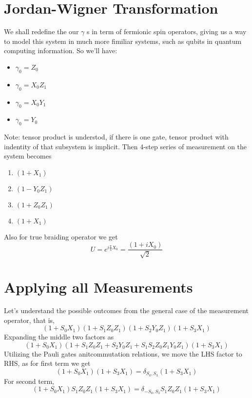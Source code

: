 \documentclass{article}
\begin{document}
\section{Jordan-Wigner Transformation} %
\label{sec:Jordan-Wigner Transformation}
We shall redefine the our $ \gamma $ s in term of fermionic spin operators, giving us a way to model 
this system in much more fimiliar systems, such as qubits in quantum computing information. So we'll have:
\begin{itemize}
  \item $ \gamma_0 = Z_0 $
  \item $ \gamma_0 = X_0 Z_1 $
  \item $ \gamma_0 = X_0 Y_1 $
  \item $ \gamma_0 = Y_0 $
\end{itemize}
Note: tensor product is understod, if there is one gate, tensor product with indentity of that subsystem is implicit.
Then 4-step series of measurement on the system becomes 
\begin{enumerate}
  \item $ (1 + X_1) $
  \item $ (1 - Y_0 Z_1) $
  \item $ (1 + Z_0 Z_1) $
  \item $ (1 + X_1) $
\end{enumerate}
Also for true braiding operator we get
\begin{equation}
  U = e^{i \frac{\pi}{4} X_0} = \frac{(1 + i X_0 )}{\sqrt{2}} 
  \label{eq:br Jordan-Wigner}
\end{equation}

\section{Applying all Measurements} %
\label{sec:Applying all Measurements}
Let's understand the possible outcomes from the general case of the measurement operator, 
that is,
\begin{equation}
  (1 +S_0 X_1) (1 +S_1 Z_0 Z_1) (1 +S_2 Y_0 Z_1) (1 +S_3 X_1)
  \label{eq:general meas}
\end{equation}
Expanding the middle two factors as
\begin{equation}
  (1 +S_0 X_1) (1 + S_1 Z_0 Z_1 + S_2 Y_0 Z_1 + S_1 S_2 Z_0 Z_1 Y_0 Z_1) (1 +S_3 X_1)
  \label{eq:expanding}
\end{equation}
Utilizing the Pauli gates anitcommutation relations, we move the LHS factor to RHS, 
as for first term we get 
\begin{equation}
  (1 +S_0 X_1) (1 +S_3 X_1) = \delta_{S_0,S_3} (1 +S_3 X_1)
  \label{eq:after mv factor 1}
\end{equation}
For second term,
\begin{equation}
  (1 +S_0 X_1) S_1 Z_0 Z_1 (1 +S_3 X_1) = \delta_{-S_0,S_3} S_1 Z_0 Z_1 (1 +S_3 X_1)
  \label{eq:after mv factor 2}
\end{equation}
\end{document}

